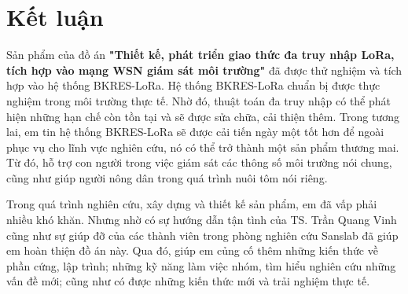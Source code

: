 \thispagestyle{plain}
\chapter*{Kết luận}
Sản phẩm của đồ án \textbf{"Thiết kế, phát triển giao thức đa truy nhập LoRa, tích hợp vào mạng WSN giám sát môi trường"} đã được thử nghiệm và tích hợp vào hệ thống BKRES-LoRa. Hệ thống BKRES-LoRa chuẩn bị được thực nghiệm trong môi trường thực tế. Nhờ đó, thuật toán đa truy nhập có thể phát hiện  những hạn chế còn tồn tại và sẽ được sửa chữa, cải thiện thêm. Trong tương lai, em tin hệ thống BKRES-LoRa sẽ được cải tiến ngày một tốt hơn để ngoài phục vụ cho lĩnh vực nghiên cứu, nó có thể trở thành một sản phẩm thương mai. Từ đó, hỗ trợ con người trong việc giám sát các thông số môi trường nói chung, cũng như giúp người nông dân trong quá trình nuôi tôm nói riêng.
\par 
Trong quá trình nghiên cứu, xây dựng và thiết kế sản phẩm, em đã vấp phải nhiều khó khăn. Nhưng nhờ có sự hướng dẫn tận tình của TS. Trần Quang Vinh cũng như sự giúp đỡ của các thành viên trong phòng nghiên cứu Sanslab đã giúp em hoàn thiện đồ án này. Qua đó, giúp em củng cố thêm những kiến thức về phần cứng, lập trình; những kỹ năng làm việc nhóm, tìm hiểu nghiên cứu những vấn đề mới; cũng như có được những kiến thức mới và trải nghiệm thực tế.